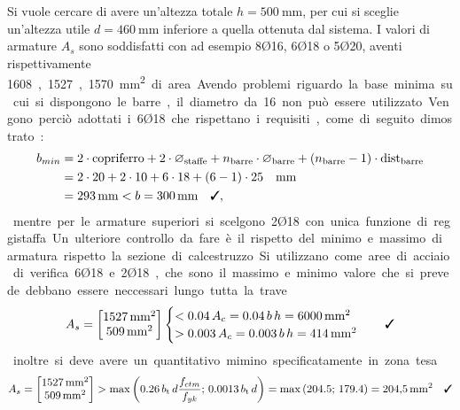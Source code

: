 Si vuole cercare di avere un'altezza totale $h = \SI{500}{\milli\metre}$, per cui si sceglie un'altezza utile $d = \SI{460}{\milli\metre}$ inferiore a quella ottenuta dal sistema. 
I valori di armature $A_s$ sono soddisfatti con ad esempio 8Ø16, 6Ø18 o 5Ø20, aventi rispettivamente \SI{1608}, \SI{1527}, \SI{1570}{\milli\metre\squared} di area.
Avendo problemi riguardo la base minima su cui si dispongono le barre, il diametro da 16 non può essere utilizzato. 
Vengono perciò adottati i 6Ø18 che rispettano i requisiti, come di seguito dimostrato:
\begin{equation}  
  \begin{split}
    b_{min} &= 2 \cdot \text{copriferro} + 2 \cdot \varnothing_\textup{staffe} + n_\textup{barre} \cdot \varnothing_\textup{barre} + \left( n_\textup{barre} - 1 \right) \cdot \text{dist}_\textup{barre}  \\
    &= 2 \cdot 20 + 2 \cdot 10 + 6 \cdot 18 + \left( 6 - 1 \right) \cdot 25 \quad \si{\milli\metre}\\
    &= \SI{293}{\milli\metre} < b = \SI{300}{\milli\metre} \quad \checked ,
  \end{split}
\end{equation}
mentre per le armature superiori si scelgono 2Ø18 con unica funzione di reggistaffa.

Un ulteriore controllo da fare è il rispetto del minimo e massimo di armatura rispetto la sezione di calcestruzzo.
Si utilizzano come aree di acciaio di verifica 6Ø18 e 2Ø18, che sono il massimo e minimo valore che si prevede debbano essere neccessari lungo tutta la trave.
\begin{equation}
  A_s =
  \begin{bmatrix}
    \SI{1527}{\milli\metre\squared} \\
    \SI{509}{\milli\metre\squared}
  \end{bmatrix}
  \begin{cases}
    < 0.04 \, A_c = 0.04 \, b \, h = \SI{6000}{\milli\metre\squared} \\
    > 0.003 \, A_c = 0.003 \, b \, h = \SI{414}{\milli\metre\squared}
  \end{cases}
  \quad \checked
\end{equation}
inoltre si deve avere un quantitativo mimino specificatamente in zona tesa
\begin{equation}
  A_s =
  \begin{bmatrix}
    \SI{1527}{\milli\metre\squared} \\
    \SI{509}{\milli\metre\squared}
  \end{bmatrix}
  > \max\left(0.26 \, b_\textup{t} \, d \frac{f_{ctm}}{f_{yk}}; \, 0.0013 \, b_\textup{t} \, d\right) = \max\left(204.5; \, 179.4\right) = \SI{204.5}{\milli\metre\squared}
  \quad \checked
\end{equation}
